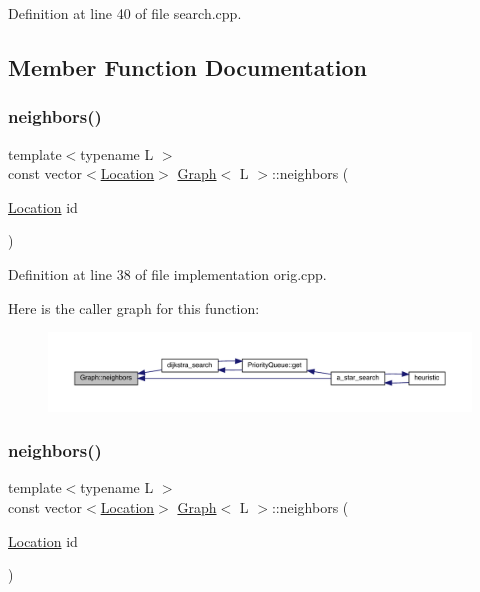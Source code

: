Definition at line 40 of file search.\+cpp.



\subsection{Member Function Documentation}
\mbox{\label{struct_graph_a8389c308ee673e63d574e0a30191662e}} 
\subsubsection{\texorpdfstring{neighbors()}{neighbors()}\hspace{0.1cm}{\footnotesize\ttfamily [1/2]}}
{\footnotesize\ttfamily template$<$typename L $>$ \\
const vector$<$\hyperlink{struct_graph_aea7d42bb67163fe692353674435a1426}{Location}$>$ \hyperlink{struct_graph}{Graph}$<$ L $>$\+::neighbors (\begin{DoxyParamCaption}\item[{\hyperlink{struct_graph_aea7d42bb67163fe692353674435a1426}{Location}}]{id }\end{DoxyParamCaption})\hspace{0.3cm}{\ttfamily [inline]}}



Definition at line 38 of file implementation orig.\+cpp.

Here is the caller graph for this function\+:\nopagebreak
\begin{figure}[H]
\begin{center}
\leavevmode
\includegraphics[width=350pt]{struct_graph_a8389c308ee673e63d574e0a30191662e_icgraph}
\end{center}
\end{figure}
\mbox{\label{struct_graph_a8389c308ee673e63d574e0a30191662e}} 
\subsubsection{\texorpdfstring{neighbors()}{neighbors()}\hspace{0.1cm}{\footnotesize\ttfamily [2/2]}}
{\footnotesize\ttfamily template$<$typename L $>$ \\
const vector$<$\hyperlink{struct_graph_aea7d42bb67163fe692353674435a1426}{Location}$>$ \hyperlink{struct_graph}{Graph}$<$ L $>$\+::neighbors (\begin{DoxyParamCaption}\item[{\hyperlink{struct_graph_aea7d42bb67163fe692353674435a1426}{Location}}]{id }\end{DoxyParamCaption})\hspace{0.3cm}{\ttfamily [inline]}}



